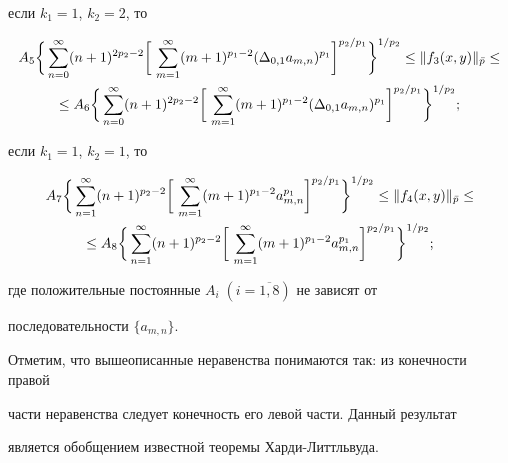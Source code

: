 \begin{thmnonum}
 если $k_1=1$, $k_2=2$, то 


\begin{multline*} 


A_5\biggl\{\,\sum^\infty_{n=0}(n+1)^{2p_2-2}\biggr[\, 


\sum^\infty_{m=1}(m+1)^{p_1-2}(\Delta_{0,1}a_{m,n})^{p_1} 


\biggr]^{p_2/p_1}\biggr\}^{1/p_2} \le \|f_3(x,y)\|_{\Bar p} \le \\ 


% 


\le A_6\biggl\{\,\sum^\infty_{n=0}(n+1)^{2p_2-2}\biggr[\, 


\sum^\infty_{m=1}(m+1)^{p_1-2}(\Delta_{0,1}a_{m,n})^{p_1} 


\biggr]^{p_2/p_1}\biggr\}^{1/p_2};


\end{multline*} 


 если $k_1=1$, $k_2=1$, то 


\begin{multline*} 


A_7\biggl\{\,\sum^\infty_{n=1}(n+1)^{p_2-2}\biggr[\, 


\sum^\infty_{m=1}(m+1)^{p_1-2}a_{m,n}^{p_1} 


\biggr]^{p_2/p_1}\biggr\}^{1/p_2} \le \|f_4(x,y)\|_{\Bar p} \le \\ 


% 


\le A_8\biggl\{\,\sum^\infty_{n=1}(n+1)^{p_2-2}\biggr[\, 


\sum^\infty_{m=1}(m+1)^{p_1-2}a_{m,n}^{p_1} 


\biggr]^{p_2/p_1}\biggr\}^{1/p_2};


\end{multline*} 


% 


где положительные постоянные $A_i\; (i=\overline{1,8})$ не зависят от 


последовательности $\{a_{m,n}\}$. 


\end{thmnonum} 


 


Отметим, что вышеописанные неравенства понимаются так: из конечности правой 


части неравенства следует конечность его левой части. Данный результат 


является обобщением известной теоремы Харди-Литтльвуда. 


